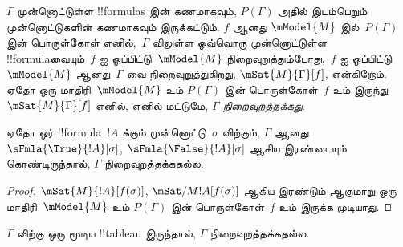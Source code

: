 \documentclass[../../../include/open-logic-section]{subfiles}
\begin{document}
\begin{defn}
  $\Gamma$ முன்னொட்டுள்ள !!{formula}s இன் கணமாகவும், $P(\Gamma)$ அதில்
  இடம்பெறும் முன்னொட்டுகளின் கணமாகவும் இருக்கட்டும். $f$ ஆனது
  $\mModel{M}$ இல்~$P(\Gamma)$ இன் பொருள்கோள் எனில்,~$\Gamma$ விலுள்ள
  ஒவ்வொரு முன்னொட்டுள்ள !!{formula}வையும்~$f$ ஐ ஒப்பிட்டு~$\mModel{M}$
  நிறைவுறுத்தும்போது,~$f$ ஐ ஒப்பிட்டு~$\mModel{M}$ ஆனது~$\Gamma$ வை
  நிறைவுறுத்துகிறது, $\mSat{M}{\Gamma}[f]$, என்கிறோம். ஏதோ ஒரு
  மாதிரி~$\mModel{M}$ உம் $P(\Gamma)$ இன் பொருள்கோள்~$f$ உம் இருந்து
  $\mSat{M}{\Gamma}[f]$ எனில், எனில் மட்டுமே, $\Gamma$
  \emph{நிறைவுறத்தக்கது}.
\end{defn}

\begin{prop}
  ஏதோ ஓர் !!{formula}~$!A$ க்கும் முன்னொட்டு~$\sigma$ விற்கும், $\Gamma$
  ஆனது $\sFmla{\True}{!A}[\sigma]$, $\sFmla{\False}{!A}[\sigma]$
  ஆகிய இரண்டையும் கொண்டிருந்தால், $\Gamma$ நிறைவுறத்தக்கதல்ல.
\end{prop}

\begin{proof}
  $\mSat{M}{!A}[f(\sigma)]$, $\mSat/{M}{!A}[f(\sigma)]$ ஆகிய இரண்டும்
  ஆகுமாறு ஒரு மாதிரி~$\mModel{M}$ உம் $P(\Gamma)$ இன் பொருள்கோள்~$f$ உம்
  இருக்க முடியாது.
\end{proof}

\begin{thm}[சரித்தன்மை]
  $\Gamma$ விற்கு ஒரு மூடிய !!{tableau} இருந்தால், $\Gamma$
  நிறைவுறத்தக்கதல்ல.
\end{thm}
\end{document}
